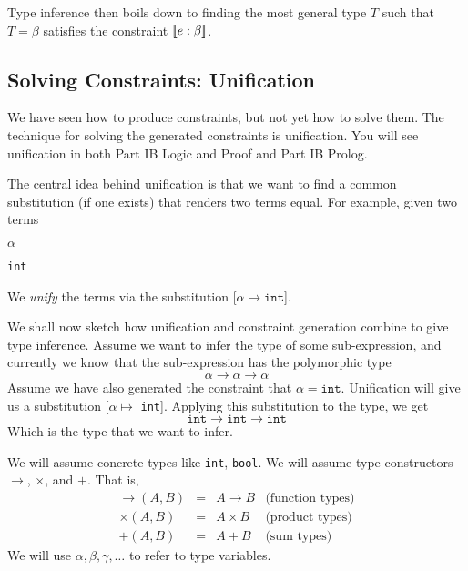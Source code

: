 {Type inference then boils down to finding the most general type $T$ such that $T = \beta$ satisfies the constraint $[\![e: \beta]\!]$.

\subsection{Solving Constraints: Unification}
We have seen how to produce constraints, but not yet how to solve them. The technique for solving the generated constraints is unification. You will see unification in both \textsf{Part IB Logic and Proof} and \textsf{Part IB Prolog}.

The central idea behind unification is that we want to find a common substitution (if one exists) that renders two terms equal. For example, given two terms

\begin{center}
\begin{minipage}[t]{0.3\textwidth}
\centering
$\alpha$
\end{minipage}%
\begin{minipage}[t]{0.3\textwidth}
\centering
\texttt{int}
\end{minipage}
\end{center}

We \textit{unify} the terms via the substitution [$\alpha \mapsto \texttt{int}$]. 

We shall now sketch how unification and constraint generation combine to give type inference. Assume we want to infer the type of some sub-expression, and currently we know that the sub-expression has the polymorphic type
\[\alpha \to \alpha \to \alpha\]
Assume we have also generated the constraint that $\alpha = \texttt{int}$. Unification will give us a substitution [$\alpha \mapsto$ \texttt{int}]. Applying this substitution to the type, we get
\[\texttt{int} \to \texttt{int} \to \texttt{int}\]
Which is the type that we want to infer.

We will assume concrete types like \texttt{int}, \texttt{bool}. We will assume type constructors $\to$, $\times$, and $+$. That is, 
\[\begin{array}{lllr}
    \to(A, B) &=& A \to B & \text{(function types)} \\
    \times(A, B) &=& A \times B & \text{(product types)} \\
    +(A, B) &=& A + B & \text{(sum types)}
\end{array}
\]
We will use $\alpha, \beta, \gamma, \ldots$ to refer to type variables. 

}
